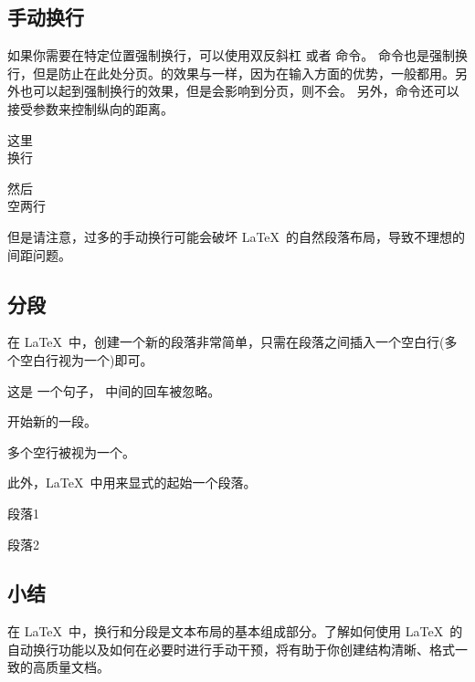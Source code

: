 {\subsection{手动换行}
如果你需要在特定位置强制换行，可以使用双反斜杠 \texinline{\\} 或者 \texinline{\newline} 命令。
\texinline{\\*}命令也是强制换行，但是防止在此处分页。\texinline{\newline}的效果与\texinline{\\}一样，因为\texinline{\\}在输入方面的优势，一般都用\texinline{\\}。另外\texinline{\linebreak}也可以起到强制换行的效果，但是\texinline{\linebreak}会影响到分页，\texinline{\newline}则不会。
另外，\texinline{\\}命令还可以接受参数来控制纵向的距离。
\begin{texlst}
	这里\\换行

	然后\\[2em]空两行
\end{texlst}

但是请注意，过多的手动换行可能会破坏 \LaTeX\ 的自然段落布局，导致不理想的间距问题。
\subsection{分段}
在 \LaTeX\ 中，创建一个新的段落非常简单，只需在段落之间插入一个空白行(多个空白行视为一个)即可。
\begin{texlst}
	这是
	一个句子，
	中间的回车被忽略。

	开始新的一段。



	多个空行被视为一个。
\end{texlst}

此外，\LaTeX\ 中用\texinline{\par}来显式的起始一个段落。

\begin{texlst}
	段落1\par 段落2
\end{texlst}

\subsection{小结}
在 \LaTeX\ 中，换行和分段是文本布局的基本组成部分。了解如何使用 \LaTeX\ 的自动换行功能以及如何在必要时进行手动干预，将有助于你创建结构清晰、格式一致的高质量文档。

}

